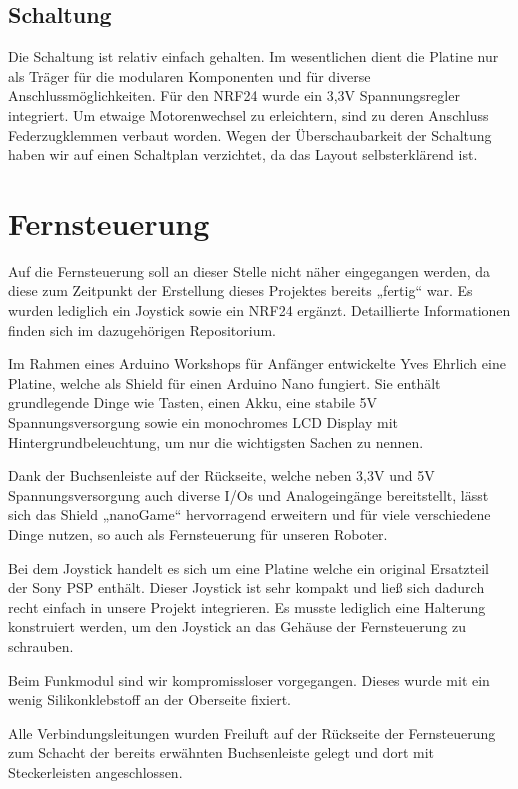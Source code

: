 \documentclass[12pt]{article}
\begin{document}
\subsection{Schaltung}%

Die Schaltung ist relativ einfach gehalten. Im wesentlichen dient die Platine nur als Träger für die modularen Komponenten und für diverse Anschlussmöglichkeiten. Für den NRF24 wurde ein 3,3V Spannungsregler integriert.
Um etwaige Motorenwechsel zu erleichtern, sind zu deren Anschluss Federzugklemmen verbaut worden.
Wegen der Überschaubarkeit der Schaltung haben wir auf einen Schaltplan verzichtet, da das Layout selbsterklärend ist.

\newpage
\section{Fernsteuerung}%

Auf die Fernsteuerung soll an dieser Stelle nicht näher eingegangen werden, da diese zum Zeitpunkt der Erstellung dieses Projektes bereits „fertig“ war.
Es wurden lediglich ein Joystick sowie ein NRF24 ergänzt.
Detaillierte Informationen finden sich im dazugehörigen Repositorium\cite{nanoGame}.

Im Rahmen eines Arduino Workshops für Anfänger entwickelte Yves Ehrlich eine Platine, welche als Shield für einen Arduino Nano fungiert. Sie enthält grundlegende Dinge wie Tasten, einen Akku, eine stabile 5V Spannungsversorgung sowie ein monochromes LCD Display mit Hintergrundbeleuchtung, um nur die wichtigsten Sachen zu nennen.

Dank der Buchsenleiste auf der Rückseite, welche neben 3,3V und 5V Spannungsversorgung auch diverse I/Os und Analogeingänge bereitstellt, lässt sich das Shield „nanoGame“ hervorragend erweitern und für viele verschiedene Dinge nutzen, so auch als Fernsteuerung für unseren Roboter.

Bei dem Joystick handelt es sich um eine Platine welche ein original Ersatzteil der Sony PSP enthält. Dieser Joystick ist sehr kompakt und ließ sich dadurch recht einfach in unsere Projekt integrieren. Es musste lediglich eine Halterung konstruiert werden, um den Joystick an das Gehäuse der Fernsteuerung zu schrauben.

Beim Funkmodul sind wir kompromissloser vorgegangen. Dieses wurde mit ein wenig Silikonklebstoff an der Oberseite fixiert.

Alle Verbindungsleitungen wurden Freiluft auf der Rückseite der Fernsteuerung zum Schacht der bereits erwähnten Buchsenleiste gelegt und dort mit Steckerleisten angeschlossen.
\end{document}
